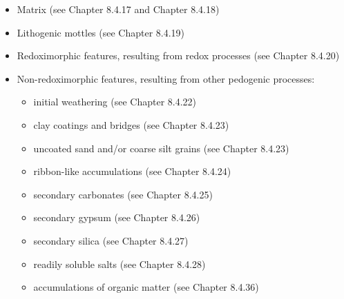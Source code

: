 \documentclass[
  letterpaper,
  DIV=11,
  numbers=noendperiod]{scrreprt}
\providecommand{\tightlist}{%
  \setlength{\itemsep}{0pt}\setlength{\parskip}{0pt}}\usepackage{longtable,booktabs,array}
\begin{document}
\begin{itemize}
\tightlist
\item
  Matrix (see Chapter 8.4.17 and Chapter 8.4.18)
\item
  Lithogenic mottles (see Chapter 8.4.19)
\item
  Redoximorphic features, resulting from redox processes (see Chapter
  8.4.20)
\item
  Non-redoximorphic features, resulting from other pedogenic processes:

  \begin{itemize}
  \tightlist
  \item
    initial weathering (see Chapter 8.4.22)
  \item
    clay coatings and bridges (see Chapter 8.4.23)
  \item
    uncoated sand and/or coarse silt grains (see Chapter 8.4.23)
  \item
    ribbon-like accumulations (see Chapter 8.4.24)
  \item
    secondary carbonates (see Chapter 8.4.25)
  \item
    secondary gypsum (see Chapter 8.4.26)
  \item
    secondary silica (see Chapter 8.4.27)
  \item
    readily soluble salts (see Chapter 8.4.28)
  \item
    accumulations of organic matter (see Chapter 8.4.36)
  \end{itemize}
\end{itemize}
\end{document}
